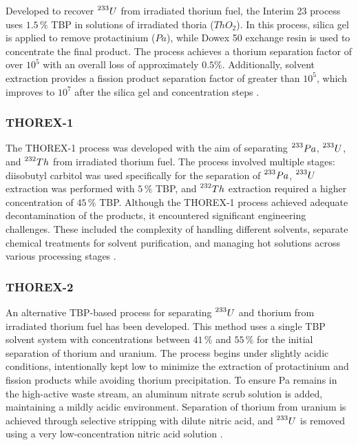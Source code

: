 Developed to recover \(\prescript{233}{}{U}\) from irradiated thorium fuel, the Interim 23 process uses \(1.5 \, \%\) TBP in solutions of irradiated thoria (\(ThO_2\)). In this process, silica gel is applied to remove protactinium (\(Pa\)), while Dowex 50 exchange resin is used to concentrate the final product. The process achieves a thorium separation factor of over \(10^5\) with an overall loss of approximately \(0.5\%\). Additionally, solvent extraction provides a fission product separation factor of greater than \(10^5\), which improves to \(10^7\) after the silica gel and concentration steps \cite{fuel_cycle_book}.


\subsubsection{THOREX-1}

The THOREX-1 process was developed with the aim of separating \(\prescript{233}{}{Pa}\), \(\prescript{233}{}{U}\), and \(\prescript{232}{}{Th}\) from irradiated thorium fuel. The process involved multiple stages: diisobutyl carbitol was used specifically for the separation of \(\prescript{233}{}{Pa}\), \(\prescript{233}{}{U}\) extraction was performed with \(5 \, \%\) TBP, and \(\prescript{232}{}{Th}\) extraction required a higher concentration of \(45 \, \%\) TBP. Although the THOREX-1 process achieved adequate decontamination of the products, it encountered significant engineering challenges. These included the complexity of handling different solvents, separate chemical treatments for solvent purification, and managing hot solutions across various processing stages \cite{fuel_cycle_book}.


\subsubsection{THOREX-2}

An alternative TBP-based process for separating \(\prescript{233}{}{U}\) and thorium from irradiated thorium fuel has been developed. This method uses a single TBP solvent system with concentrations between \(41 \, \%\) and \(55 \, \%\) for the initial separation of thorium and uranium. The process begins under slightly acidic conditions, intentionally kept low to minimize the extraction of protactinium and fission products while avoiding thorium precipitation. To ensure Pa remains in the high-active waste stream, an aluminum nitrate scrub solution is added, maintaining a mildly acidic environment. Separation of thorium from uranium is achieved through selective stripping with dilute nitric acid, and \(\prescript{233}{}{U}\) is removed using a very low-concentration nitric acid solution \cite{fuel_cycle_book}. 

